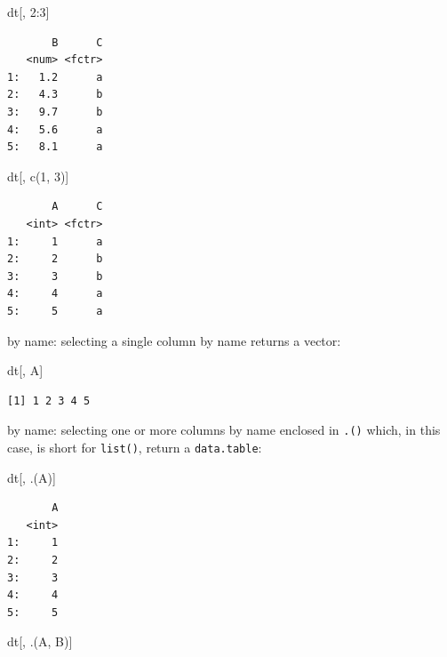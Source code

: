 \documentclass[
]{book}
\newenvironment{Shaded}{\begin{snugshade}}{\end{snugshade}}
\newcommand{\DecValTok}[1]{\textcolor[rgb]{0.00,0.00,0.81}{#1}}
\newcommand{\FunctionTok}[1]{\textcolor[rgb]{0.00,0.00,0.00}{#1}}
\newcommand{\NormalTok}[1]{#1}
\newcommand{\SpecialCharTok}[1]{\textcolor[rgb]{0.00,0.00,0.00}{#1}}
\begin{document}
\begin{Shaded}
\begin{Highlighting}[]
\NormalTok{dt[, }\DecValTok{2}\SpecialCharTok{:}\DecValTok{3}\NormalTok{]}
\end{Highlighting}
\end{Shaded}

\begin{verbatim}
       B      C
   <num> <fctr>
1:   1.2      a
2:   4.3      b
3:   9.7      b
4:   5.6      a
5:   8.1      a
\end{verbatim}

\begin{Shaded}
\begin{Highlighting}[]
\NormalTok{dt[, }\FunctionTok{c}\NormalTok{(}\DecValTok{1}\NormalTok{, }\DecValTok{3}\NormalTok{)]}
\end{Highlighting}
\end{Shaded}

\begin{verbatim}
       A      C
   <int> <fctr>
1:     1      a
2:     2      b
3:     3      b
4:     4      a
5:     5      a
\end{verbatim}

by name: selecting a single column by name returns a vector:

\begin{Shaded}
\begin{Highlighting}[]
\NormalTok{dt[, A]}
\end{Highlighting}
\end{Shaded}

\begin{verbatim}
[1] 1 2 3 4 5
\end{verbatim}

by name: selecting one or more columns by name enclosed in \texttt{.()} which, in this case, is short for \texttt{list()}, return a \texttt{data.table}:

\begin{Shaded}
\begin{Highlighting}[]
\NormalTok{dt[, .(A)]}
\end{Highlighting}
\end{Shaded}

\begin{verbatim}
       A
   <int>
1:     1
2:     2
3:     3
4:     4
5:     5
\end{verbatim}

\begin{Shaded}
\begin{Highlighting}[]
\NormalTok{dt[, .(A, B)]}
\end{Highlighting}
\end{Shaded}
\end{document}

